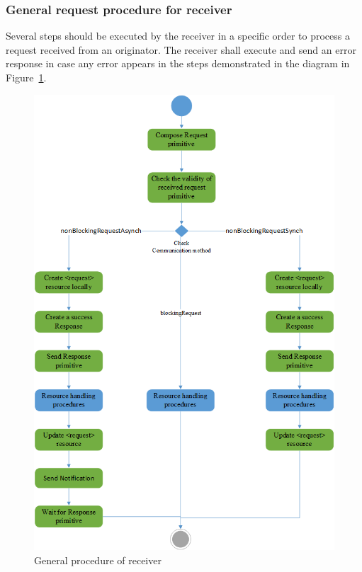 \begin{itemize}
\end{itemize}
\subsubsection*{General request procedure for receiver }

Several steps should be executed by the receiver in a specific order to process a request received from an originator. The receiver shall execute and send an error response in case any error appears in the steps demonstrated in the diagram in Figure~\ref{fig:contrib1:reci}.\par
\begin{figure}[htbp]
    \centering
    \includegraphics[width=1\textwidth]{resources/images/reci}
    \caption{General procedure of receiver }\label{fig:contrib1:reci}
\end{figure}
